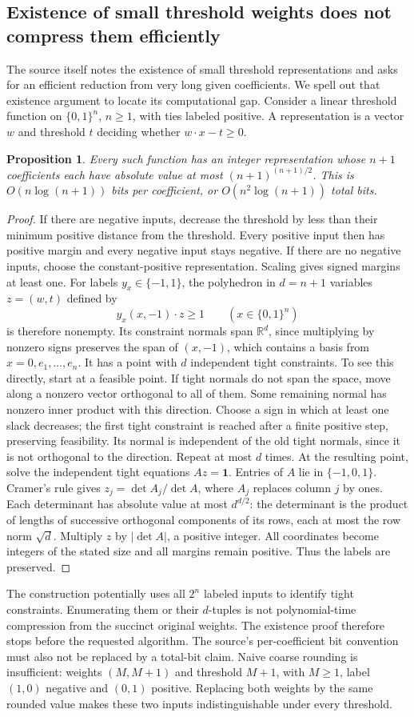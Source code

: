 \documentclass[11pt]{article}
\newtheorem{proposition}{Proposition}
\begin{document}
\subsection{Existence of small threshold weights does not compress them efficiently}
The source itself notes the existence of small threshold representations and asks for an efficient reduction from very long given coefficients. We spell out that existence argument to locate its computational gap. Consider a linear threshold function on $\{0,1\}^n$, $n\ge1$, with ties labeled positive. A representation is a vector $w$ and threshold $t$ deciding whether $w\cdot x-t\ge0$.
\begin{proposition}
Every such function has an integer representation whose $n+1$ coefficients each have absolute value at most $(n+1)^{(n+1)/2}$. This is $O(n\log(n+1))$ bits per coefficient, or $O(n^2\log(n+1))$ total bits.
\end{proposition}
\begin{proof}
If there are negative inputs, decrease the threshold by less than their minimum positive distance from the threshold. Every positive input then has positive margin and every negative input stays negative. If there are no negative inputs, choose the constant-positive representation. Scaling gives signed margins at least one. For labels $y_x\in\{-1,1\}$, the polyhedron in $d=n+1$ variables $z=(w,t)$ defined by
\[
y_x(x,-1)\cdot z\ge1\qquad(x\in\{0,1\}^n)
\]
is therefore nonempty. Its constraint normals span $\mathbb R^d$, since multiplying by nonzero signs preserves the span of $(x,-1)$, which contains a basis from $x=0,e_1,\ldots,e_n$.
It has a point with $d$ independent tight constraints. To see this directly, start at a feasible point. If tight normals do not span the space, move along a nonzero vector orthogonal to all of them. Some remaining normal has nonzero inner product with this direction. Choose a sign in which at least one slack decreases; the first tight constraint is reached after a finite positive step, preserving feasibility. Its normal is independent of the old tight normals, since it is not orthogonal to the direction. Repeat at most $d$ times.
At the resulting point, solve the independent tight equations $Az=\mathbf1$. Entries of $A$ lie in $\{-1,0,1\}$. Cramer's rule gives $z_j=\det A_j/\det A$, where $A_j$ replaces column $j$ by ones. Each determinant has absolute value at most $d^{d/2}$: the determinant is the product of lengths of successive orthogonal components of its rows, each at most the row norm $\sqrt d$. Multiply $z$ by $|\det A|$, a positive integer. All coordinates become integers of the stated size and all margins remain positive. Thus the labels are preserved.
\end{proof}
The construction potentially uses all $2^n$ labeled inputs to identify tight constraints. Enumerating them or their $d$-tuples is not polynomial-time compression from the succinct original weights. The existence proof therefore stops before the requested algorithm. The source's per-coefficient bit convention must also not be replaced by a total-bit claim.
Naive coarse rounding is insufficient: weights $(M,M+1)$ and threshold $M+1$, with $M\ge1$, label $(1,0)$ negative and $(0,1)$ positive. Replacing both weights by the same rounded value makes these two inputs indistinguishable under every threshold.
\end{document}
